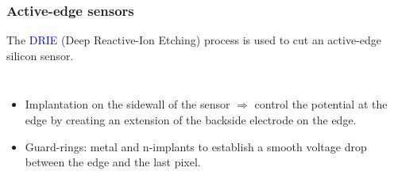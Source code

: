 \begin{frame}
  \frametitle{Active-edge sensors}

  The \textcolor{Blue}{DRIE} (Deep Reactive-Ion Etching) process is
  used to cut an active-edge silicon sensor.

  \begin{columns}
    \begin{itemize}
    \item Implantation on the sidewall of the sensor $\Rightarrow$
      control the potential at the edge by creating an extension of the
      backside electrode on the edge.
    \item Guard-rings: metal and n-implants to establish a smooth voltage drop
      between the edge and the last pixel.
    \end{itemize}


    \begin{columns}
      \centering
      

\end{columns}
\end{columns}
\end{frame}
